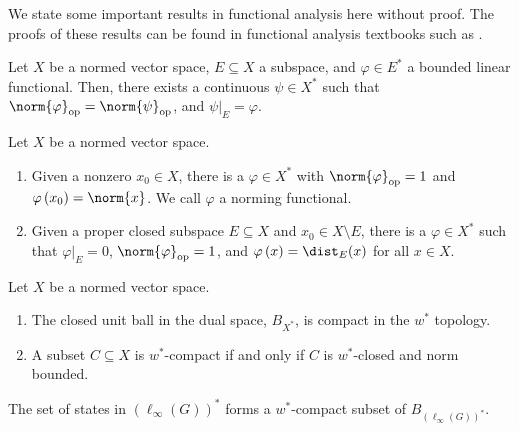 We state some important results in functional analysis here without proof. The proofs of these results can be found in functional analysis textbooks such as \cite{rudin_functional_analysis}.
\begin{theorem}
  Let $X$ be a normed vector space, $E\subseteq X$ a subspace, and $\varphi\in E^{\ast}$ a bounded linear functional. Then, there exists a continuous $\psi\in X^{\ast}$ such that $\norm{\varphi}_{\text{op}} = \norm{\psi}_{\text{op}}$, and $\psi|_{E} = \varphi$.
\end{theorem}
\begin{theorem}
  Let $X$ be a normed vector space.
  \begin{enumerate}[(1)]
    \item Given a nonzero $x_0\in X$, there is a $\varphi\in X^{\ast}$ with $\norm{\varphi}_{\text{op}} = 1$ and $\varphi\left(x_0\right) = \norm{x}$. We call $\varphi$ a norming functional.
    \item Given a proper closed subspace $E\subseteq X$ and $x_0\in X\setminus E$, there is a $\varphi\in X^{\ast}$ such that $\varphi|_{E} = 0$, $\norm{\varphi}_{\text{op}} = 1$, and $\varphi\left(x\right) = \dist_{E}(x)$ for all $x\in X$.
  \end{enumerate}
\end{theorem}
\begin{theorem}
  Let $X$ be a normed vector space.
  \begin{enumerate}[(1)]
    \item The closed unit ball in the dual space, $B_{X^{\ast}}$, is compact in the $w^{\ast}$ topology.
    \item A subset $C\subseteq X$ is $w^{\ast}$-compact if and only if $C$ is $w^{\ast}$-closed and norm bounded.
  \end{enumerate}
\end{theorem}
\begin{corollary}
  The set of states in $\left(\ell_{\infty}\left(G\right)\right)^{\ast}$ forms a $w^{\ast}$-compact subset of $B_{\left(\ell_{\infty}\left(G\right)\right)^{\ast}}$.
\end{corollary}
